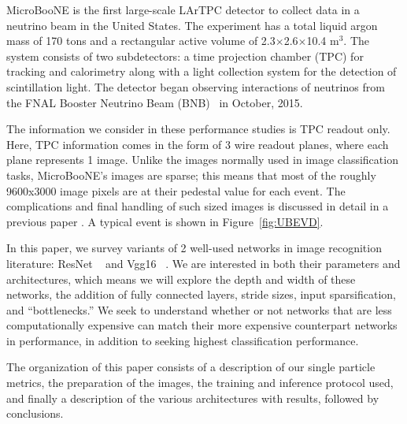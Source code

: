 \documentclass[11pt,a4paper]{article}
\begin{document}
MicroBooNE is the first large-scale LArTPC detector to collect data in a neutrino beam in the United States. The experiment has a total liquid argon mass of 170 tons and a rectangular active volume of 2.3$\times$2.6$\times$10.4 m$^3$. The system consists of two subdetectors: a time projection chamber (TPC) for tracking and calorimetry along with a light collection system for the detection of scintillation light.  The detector began observing interactions of neutrinos from the FNAL Booster Neutrino Beam (BNB)~\cite{BNB} in October, 2015.

The information we consider in these performance studies is TPC readout only. Here, TPC information comes in the form of 3 wire readout planes, where each plane represents 1 image.  Unlike the images normally used in image classification tasks, MicroBooNE's images are sparse; this means that most of the roughly 9600x3000 image pixels are at their pedestal value for each event. The complications and final handling of such sized images is discussed in detail in a previous paper \cite{uB-JINST}. A typical event is shown in Figure~\ref{fig:UBEVD}.


In this paper, we survey variants of 2 well-used networks in image recognition literature: ResNet ~\cite{} and Vgg16 ~\cite{}. We are interested in both their parameters and architectures, which means we will explore the depth and width of these networks, the addition of fully connected layers, stride sizes, input sparsification, and ``bottlenecks.''  We seek to understand whether or not networks that are less computationally expensive can match their more expensive counterpart networks in performance, in addition to seeking highest classification performance. 


The organization of this paper consists of a description of our single particle metrics, the preparation of the images, the training and inference protocol used, and finally a description of the various architectures with results, followed by conclusions.
\end{document}
